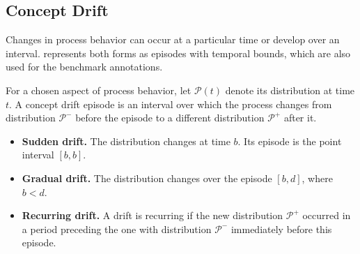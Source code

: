 \subsection{Concept Drift}

Changes in process behavior can occur at a particular time or develop over an interval.  represents both forms as episodes with temporal bounds, which are also used for the benchmark annotations.

\begin{Definition}\label{def:drift}
For a chosen aspect of process behavior, let $\mathcal P(t)$ denote its distribution at time $t$. A concept drift episode is an interval over which the process changes from distribution $\mathcal P^-$ before the episode to a different distribution $\mathcal P^+$ after it.
\begin{itemize}
  \item \textbf{Sudden drift.} The distribution changes at time $b$. Its episode is the point interval $[b,b]$.
  \item \textbf{Gradual drift.} The distribution changes over the episode $[b,d]$, where $b<d$.
  \item \textbf{Recurring drift.} A drift is recurring if the new distribution $\mathcal P^+$ occurred in a period preceding the one with distribution $\mathcal P^-$ immediately before this episode.
\end{itemize}
\end{Definition}
